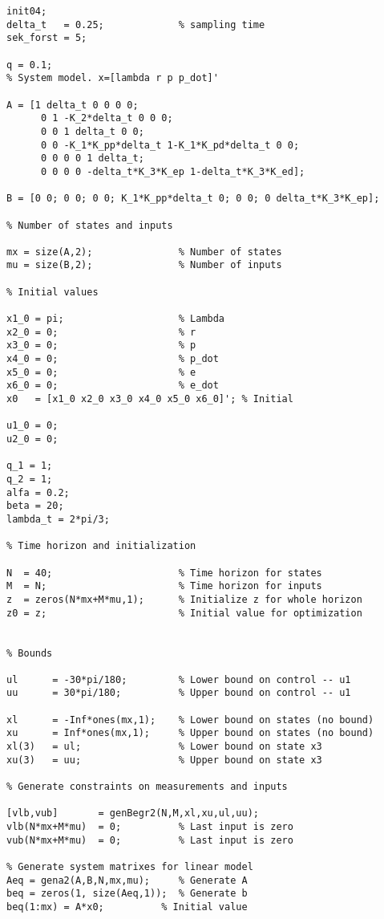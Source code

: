 \begin{lstlisting}
init04;
delta_t	  = 0.25;             % sampling time
sek_forst = 5;

q = 0.1;
% System model. x=[lambda r p p_dot]'

A = [1 delta_t 0 0 0 0;
      0 1 -K_2*delta_t 0 0 0;
      0 0 1 delta_t 0 0;
      0 0 -K_1*K_pp*delta_t 1-K_1*K_pd*delta_t 0 0;
      0 0 0 0 1 delta_t;
      0 0 0 0 -delta_t*K_3*K_ep 1-delta_t*K_3*K_ed];
  
B = [0 0; 0 0; 0 0; K_1*K_pp*delta_t 0; 0 0; 0 delta_t*K_3*K_ep];

% Number of states and inputs

mx = size(A,2);               % Number of states 
mu = size(B,2);               % Number of inputs

% Initial values

x1_0 = pi;                    % Lambda
x2_0 = 0;                     % r
x3_0 = 0;                     % p
x4_0 = 0;                     % p_dot
x5_0 = 0;                     % e
x6_0 = 0;                     % e_dot
x0   = [x1_0 x2_0 x3_0 x4_0 x5_0 x6_0]'; % Initial

u1_0 = 0;
u2_0 = 0;

q_1 = 1;
q_2 = 1;
alfa = 0.2;
beta = 20;
lambda_t = 2*pi/3;

% Time horizon and initialization

N  = 40;                      % Time horizon for states
M  = N;                       % Time horizon for inputs
z  = zeros(N*mx+M*mu,1);      % Initialize z for whole horizon
z0 = z;                       % Initial value for optimization


% Bounds

ul 	    = -30*pi/180;         % Lower bound on control -- u1
uu 	    = 30*pi/180;          % Upper bound on control -- u1

xl      = -Inf*ones(mx,1);    % Lower bound on states (no bound)
xu      = Inf*ones(mx,1);     % Upper bound on states (no bound)
xl(3)   = ul;                 % Lower bound on state x3
xu(3)   = uu;                 % Upper bound on state x3

% Generate constraints on measurements and inputs

[vlb,vub]       = genBegr2(N,M,xl,xu,ul,uu);
vlb(N*mx+M*mu)  = 0;          % Last input is zero
vub(N*mx+M*mu)  = 0;          % Last input is zero

% Generate system matrixes for linear model
Aeq = gena2(A,B,N,mx,mu);     % Generate A
beq = zeros(1, size(Aeq,1));  % Generate b
beq(1:mx) = A*x0; 	       % Initial value


\end{lstlisting}
